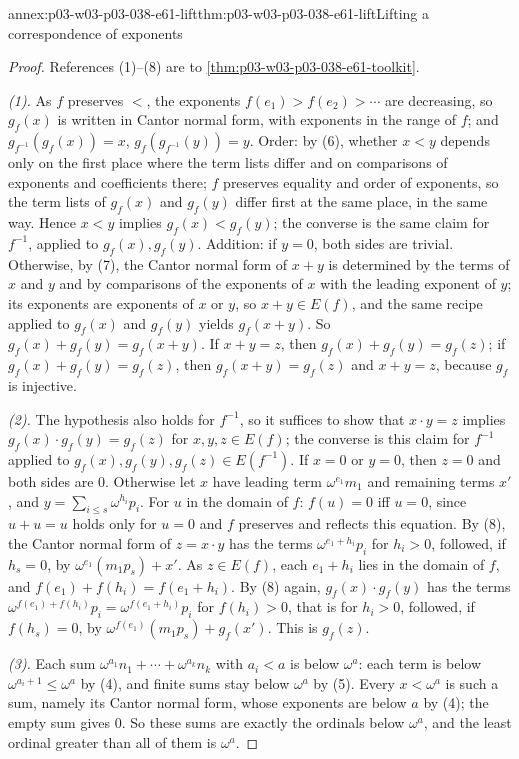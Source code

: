 \begin{annexitem}{annex:p03-w03-p03-038-e61-lift}{thm:p03-w03-p03-038-e61-lift}{Lifting a correspondence of exponents}
\begin{proof}
References (1)--(8) are to \cref{thm:p03-w03-p03-038-e61-toolkit}.

\emph{(1).} As \(f\) preserves \(<\), the exponents
\(f(e_1)>f(e_2)>\cdots\) are decreasing, so \(g_f(x)\) is written in Cantor
normal form, with exponents in the range of \(f\); and
\(g_{f^{-1}}(g_f(x))=x\), \(g_f(g_{f^{-1}}(y))=y\). Order: by (6),
whether \(x<y\) depends only on the first place where the term lists
differ and on comparisons of exponents and coefficients there; \(f\)
preserves equality and order of exponents, so the term lists of
\(g_f(x)\) and \(g_f(y)\) differ first at the same place, in the same way.
Hence \(x<y\) implies \(g_f(x)<g_f(y)\); the converse is the same claim
for \(f^{-1}\), applied to \(g_f(x),g_f(y)\). Addition: if \(y=0\), both
sides are trivial. Otherwise, by (7), the Cantor normal form of \(x+y\) is
determined by the terms of \(x\) and \(y\) and by comparisons of the
exponents of \(x\) with the leading exponent of \(y\); its exponents are
exponents of \(x\) or \(y\), so \(x+y\in E(f)\), and the same recipe
applied to \(g_f(x)\) and \(g_f(y)\) yields \(g_f(x+y)\). So
\(g_f(x)+g_f(y)=g_f(x+y)\). If \(x+y=z\), then
\(g_f(x)+g_f(y)=g_f(z)\); if \(g_f(x)+g_f(y)=g_f(z)\), then
\(g_f(x+y)=g_f(z)\) and \(x+y=z\), because \(g_f\) is injective.

\emph{(2).} The hypothesis also holds for \(f^{-1}\), so it suffices to
show that \(x\cdot y=z\) implies \(g_f(x)\cdot g_f(y)=g_f(z)\) for
\(x,y,z\in E(f)\); the converse is this claim for \(f^{-1}\) applied to
\(g_f(x),g_f(y),g_f(z)\in E(f^{-1})\). If \(x=0\) or \(y=0\), then
\(z=0\) and both sides are \(0\). Otherwise let \(x\) have leading term
\(\omega^{e_1}m_1\) and remaining terms \(x'\), and
\(y=\sum_{i\le s}\omega^{h_i}p_i\). For \(u\) in the domain of \(f\):
\(f(u)=0\) iff \(u=0\), since \(u+u=u\) holds only for \(u=0\) and \(f\)
preserves and reflects this equation. By (8), the Cantor normal form of
\(z=x\cdot y\) has the terms \(\omega^{e_1+h_i}p_i\) for \(h_i>0\),
followed, if \(h_s=0\), by \(\omega^{e_1}(m_1p_s)+x'\). As \(z\in E(f)\),
each \(e_1+h_i\) lies in the domain of \(f\), and
\(f(e_1)+f(h_i)=f(e_1+h_i)\). By (8) again, \(g_f(x)\cdot g_f(y)\) has the
terms \(\omega^{f(e_1)+f(h_i)}p_i=\omega^{f(e_1+h_i)}p_i\) for
\(f(h_i)>0\), that is for \(h_i>0\), followed, if \(f(h_s)=0\), by
\(\omega^{f(e_1)}(m_1p_s)+g_f(x')\). This is \(g_f(z)\).

\emph{(3).} Each sum \(\omega^{a_1}n_1+\cdots+\omega^{a_k}n_k\) with
\(a_i<a\) is below \(\omega^a\): each term is below
\(\omega^{a_i+1}\le\omega^a\) by (4), and finite sums stay below
\(\omega^a\) by (5). Every \(x<\omega^a\) is such a sum, namely its Cantor
normal form, whose exponents are below \(a\) by (4); the empty sum gives
\(0\). So these sums are exactly the ordinals below \(\omega^a\), and the
least ordinal greater than all of them is \(\omega^a\).
\end{proof}
\end{annexitem}

